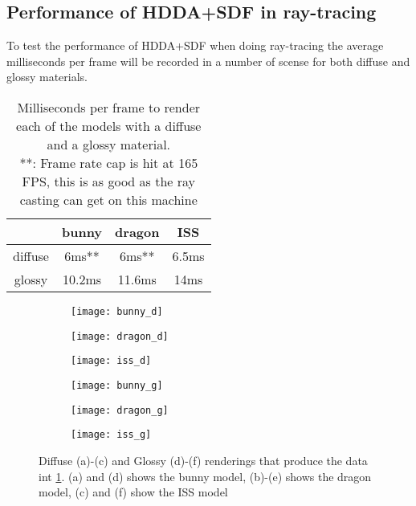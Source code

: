 \subsection{Performance of HDDA+SDF in ray-tracing}

To test the performance of HDDA+SDF when doing ray-tracing the average milliseconds per frame will be recorded in a number of scense for both diffuse and glossy materials.

\begin{table}[h]
  \centering
  \begin{tabular}{|c||c|c|c|}
    \hline
    & bunny & dragon & ISS \\
    \hline
    diffuse & 6ms** & 6ms** & 6.5ms \\
    \hline
    glossy & 10.2ms & 11.6ms & 14ms \\
    \hline
  \end{tabular}
  \caption{Milliseconds per frame to render each of the models with a diffuse and a glossy material. \\
    **: Frame rate cap is hit at 165 FPS, this is as good as the ray casting can get on this machine}
  \label{sdf_test}
\end{table}

\begin{figure}[H]
  \centering
  \begin{subfigure}[b]{0.3\textwidth}
    \texttt{[image: bunny\_d]}
    \caption{}
  \end{subfigure}
  \hfill
  \begin{subfigure}[b]{0.3\textwidth}
    \texttt{[image: dragon\_d]}
    \caption{}
  \end{subfigure}
  \hfill
  \begin{subfigure}[b]{0.3\textwidth}
    \texttt{[image: iss\_d]}
    \caption{}
  \end{subfigure}
  \hfill
  \begin{subfigure}[b]{0.3\textwidth}
    \texttt{[image: bunny\_g]}
    \caption{}
  \end{subfigure}
  \hfill
  \begin{subfigure}[b]{0.3\textwidth}
    \texttt{[image: dragon\_g]}
    \caption{}
  \end{subfigure}
  \hfill
  \begin{subfigure}[b]{0.3\textwidth}
    \texttt{[image: iss\_g]}
    \caption{}
  \end{subfigure}
  \caption{Diffuse (a)-(c) and Glossy (d)-(f) renderings that produce the data int \cref{sdf_test}. (a) and (d) shows the bunny model, (b)-(e) shows the dragon model, (c) and (f) show the ISS model}
\end{figure}

